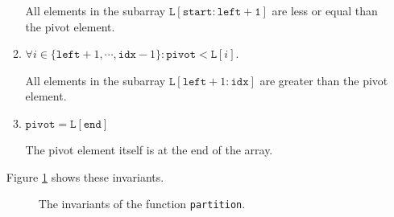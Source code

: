 \begin{enumerate}
\begin{enumerate}
            All elements in the subarray $\mathtt{L[start:left+1]}$ are less or equal than the pivot element.
      \item $\forall i \in \{ \mathtt{left}+1,\cdots,\mathtt{idx}-1\}:\mathtt{pivot} < \mathtt{L}[i]$.

            All elements in the subarray $\mathtt{L}[\mathtt{left}+1:\mathtt{idx}]$ are greater than the pivot
            element.
      \item $\mathtt{pivot} = \mathtt{L[end]}$

            The pivot element itself is at the end of the array.
      \end{enumerate}
      Figure \ref{fig:lomuto.png} shows these invariants.

\begin{figure}[!ht]
  \centering
  \caption{The invariants of the function \texttt{partition}.}
  \label{fig:lomuto.png}
\end{figure}



\end{enumerate}
